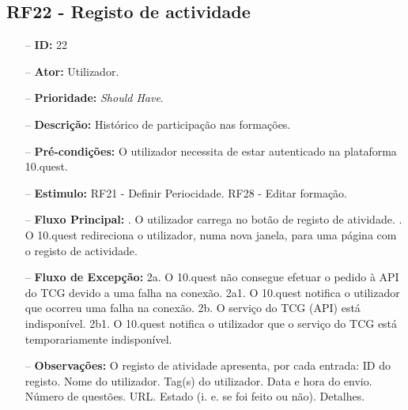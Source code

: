 \subsection{RF22 - Registo de actividade}
\begin{itemize}
	\item[--] \textbf{ID:} 22
	\item[--]  \textbf{Ator:} Utilizador.
	\item[--]  \textbf{Prioridade:} \textit{Should Have}.
	\item[--]  \textbf{Descrição:} Histórico de participação nas formações.
	\item[--]  \textbf{Pré-condições:} O utilizador necessita de estar autenticado na plataforma 10.quest.
	\item[--]  \textbf{Estimulo:}
		\subitem RF21 - Definir Periocidade.
		\subitem RF28 - Editar formação.
	\item[--]  \textbf{Fluxo Principal:} 
		. O utilizador carrega no botão de registo de atividade.
		. O 10.quest redireciona o utilizador, numa nova janela, para uma página com o registo de actividade.
	\item[--]  \textbf{Fluxo de Excepção:} 
		\subitem 2a. O 10.quest não consegue efetuar o pedido à API do TCG devido a uma falha na conexão.
		\subitem 2a1. O 10.quest notifica o utilizador que ocorreu uma falha na conexão.
		\subitem 2b. O serviço do TCG (API) está indisponível.
		\subitem 2b1. O 10.quest notifica o utilizador que o serviço do TCG está temporariamente indisponível. 
	\item[--]  \textbf{Observações:} O registo de atividade apresenta, por cada entrada:
		\subitem ID do registo.
		\subitem Nome do utilizador.
		\subitem Tag(s) do utilizador.
		\subitem Data e hora do envio.
		\subitem Número de questões.
		\subitem URL.
		\subitem Estado (i. e. se foi feito ou não).
		\subitem Detalhes.
\end{itemize}
\newpage

